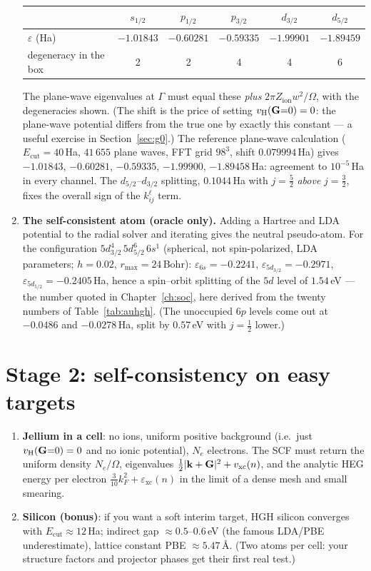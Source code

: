 \begin{enumerate}[leftmargin=2em]
\begin{center}
\begin{tabular}{@{}lccccc@{}}
\toprule
 & $s_{1/2}$ & $p_{1/2}$ & $p_{3/2}$ & $d_{3/2}$ & $d_{5/2}$\\
\midrule
$\varepsilon$ (Ha) & $-1.01843$ & $-0.60281$ & $-0.59335$ & $-1.99901$ & $-1.89459$\\
degeneracy in the box & 2 & 2 & 4 & 4 & 6\\
\bottomrule
\end{tabular}
\end{center}
The plane-wave eigenvalues at $\Gamma$ must equal these \emph{plus}
$2\pi Z_{\mathrm{ion}}w^2/\Omega$, with the degeneracies shown. (The shift
is the price of setting $\vH(\GG{=}0)=0$: the plane-wave potential differs
from the true one by exactly this constant --- a useful exercise in
Section~\ref{sec:g0}.) The reference plane-wave calculation ($E_{\mathrm{cut}} = 40$\,Ha,
$41\,655$ plane waves, FFT grid $98^3$, shift $0.079994$\,Ha) gives
$-1.01843$, $-0.60281$, $-0.59335$, $-1.99900$, $-1.89458$\,Ha: agreement
to $10^{-5}$\,Ha in every channel. The $d_{5/2}$--$d_{3/2}$
splitting, $0.1044$\,Ha with $j = \tfrac52$ \emph{above} $j=\tfrac32$,
fixes the overall sign of the $k^\ell_{ij}$ term.
\item \textbf{The self-consistent atom (oracle only).} Adding a Hartree and
LDA potential to the radial solver and iterating gives the neutral
pseudo-atom. For the configuration $5d_{3/2}^{4}\,5d_{5/2}^{6}\,6s^1$
(spherical, not spin-polarized, LDA parameters; $h = 0.02$,
$r_{\max} = 24$\,Bohr):
$\varepsilon_{6s} = -0.2241$, $\varepsilon_{5d_{3/2}} = -0.2971$,
$\varepsilon_{5d_{5/2}} = -0.2405$\,Ha, hence a spin--orbit splitting of
the $5d$ level of $1.54$\,eV --- the number quoted in
Chapter~\ref{ch:soc}, here derived from the twenty numbers of
Table~\ref{tab:auhgh}. (The unoccupied $6p$ levels come out at $-0.0486$
and $-0.0278$\,Ha, split by $0.57$\,eV with $j=\tfrac12$ lower.)
\end{enumerate}

\section{Stage 2: self-consistency on easy targets}
\begin{enumerate}[leftmargin=2em]
\item \textbf{Jellium in a cell}: no ions, uniform positive background
(i.e.\ just $\vH(\GG{=}0) = 0$ and no ionic potential), $N_e$ electrons.
The SCF must return the uniform density $N_e/\Omega$, eigenvalues
$\tfrac12|\mathbf{k}+\mathbf{G}|^2 + v_{\mathrm{xc}}(n)$, and the analytic HEG energy per electron
$\tfrac{3}{10}k_F^2 + \varepsilon_{\mathrm{xc}}(n)$ in the limit of a dense
mesh and small smearing.
\item \textbf{Silicon (bonus)}: if you want a soft interim target, HGH
silicon converges with $E_{\mathrm{cut}} \approx 12$\,Ha; indirect
gap $\approx 0.5$--$0.6$\,eV (the famous LDA/PBE underestimate), lattice
constant PBE $\approx 5.47$\,\AA. (Two atoms per cell: your structure
factors and projector phases get their first real test.)
\end{enumerate}

